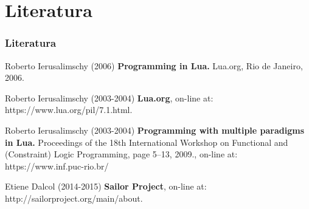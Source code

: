 \documentclass{beamer}
\begin{document}
\section{Literatura}

\begin{frame}
\frametitle{Literatura}
\footnotesize{
\begin{thebibliography}{99}

 Roberto Ierusalimschy (2006)
\newblock \small{\textbf{Programming in Lua.} Lua.org, Rio de Janeiro, 2006.}

 Roberto Ierusalimschy (2003-2004)
\newblock \small{\textbf{Lua.org}, on-line at: https://www.lua.org/pil/7.1.html.}

 Roberto Ierusalimschy (2003-2004)
\newblock \small{\textbf{Programming with multiple paradigms in
Lua.} Proceedings of the 18th International Workshop on Functional
and (Constraint) Logic Programming, page 5–13, 2009.}, on-line at: https://www.inf.puc-rio.br/%

 Etiene Dalcol (2014-2015)
\newblock \small{\textbf{Sailor Project}, on-line at: http://sailorproject.org/main/about.}

\end{thebibliography}
}
\end{frame}
\end{document}
